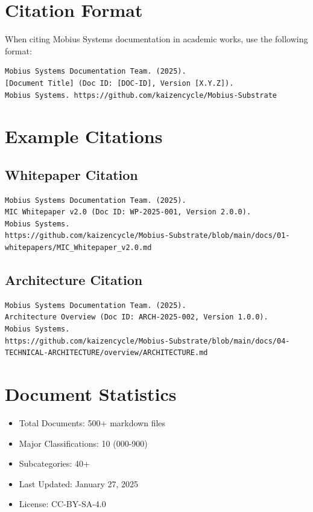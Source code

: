 \documentclass[11pt,a4paper]{article}
\begin{document}
\section{Citation Format}

When citing Mobius Systems documentation in academic works, use the following format:

\begin{verbatim}
Mobius Systems Documentation Team. (2025). 
[Document Title] (Doc ID: [DOC-ID], Version [X.Y.Z]). 
Mobius Systems. https://github.com/kaizencycle/Mobius-Substrate
\end{verbatim}

\section{Example Citations}

\subsection{Whitepaper Citation}

\begin{verbatim}
Mobius Systems Documentation Team. (2025). 
MIC Whitepaper v2.0 (Doc ID: WP-2025-001, Version 2.0.0). 
Mobius Systems. 
https://github.com/kaizencycle/Mobius-Substrate/blob/main/docs/01-whitepapers/MIC_Whitepaper_v2.0.md
\end{verbatim}

\subsection{Architecture Citation}

\begin{verbatim}
Mobius Systems Documentation Team. (2025). 
Architecture Overview (Doc ID: ARCH-2025-002, Version 1.0.0). 
Mobius Systems. 
https://github.com/kaizencycle/Mobius-Substrate/blob/main/docs/04-TECHNICAL-ARCHITECTURE/overview/ARCHITECTURE.md
\end{verbatim}

\section{Document Statistics}

\begin{itemize}
    \item Total Documents: 500+ markdown files
    \item Major Classifications: 10 (000-900)
    \item Subcategories: 40+
    \item Last Updated: January 27, 2025
    \item License: CC-BY-SA-4.0
\end{itemize}
\end{document}
